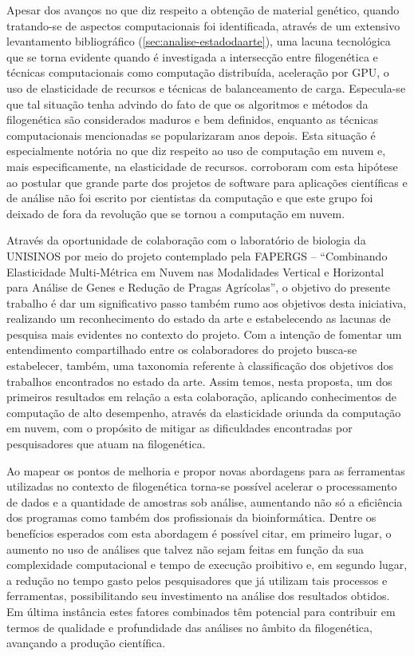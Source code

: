 \documentclass[english,brazilian]{UNISINOSmonografia} %
\begin{document}
Apesar dos avanços no que diz respeito a obtenção de material genético, quando tratando-se de aspectos computacionais foi identificada, através de um extensivo levantamento bibliográfico (\autoref{sec:analise-estadodaarte}), uma lacuna tecnológica que se torna evidente quando é investigada a intersecção entre filogenética e técnicas computacionais como computação distribuída, aceleração por GPU, o uso de elasticidade de recursos e técnicas de balanceamento de carga.
Especula-se que tal situação tenha advindo do fato de que os algoritmos e métodos da filogenética são considerados maduros e bem definidos, enquanto as técnicas computacionais mencionadas se popularizaram anos depois.
Esta situação é especialmente notória no que diz respeito ao uso de computação em nuvem e, mais especificamente, na elasticidade de recursos.
 corroboram com esta hipótese ao postular que grande parte dos projetos de software para aplicações científicas e de análise não foi escrito por cientistas da computação e que este grupo foi deixado de fora da revolução que se tornou a computação em nuvem.



Através da oportunidade de colaboração com o laboratório de biologia da UNISINOS por meio do projeto contemplado pela FAPERGS -- ``Combinando Elasticidade Multi-Métrica em Nuvem nas Modalidades Vertical e Horizontal para Análise de Genes e Redução de Pragas Agrícolas'', o objetivo do presente trabalho é dar um significativo passo também rumo aos objetivos desta iniciativa, realizando um reconhecimento do estado da arte e estabelecendo as lacunas de pesquisa mais evidentes no contexto do projeto.
Com a intenção de fomentar um entendimento compartilhado entre os colaboradores do projeto busca-se estabelecer, também, uma taxonomia referente à classificação dos objetivos dos trabalhos encontrados no estado da arte.
Assim temos, nesta proposta, um dos primeiros resultados em relação a esta colaboração, aplicando conhecimentos de computação de alto desempenho, através da elasticidade oriunda da computação em nuvem, com o propósito de mitigar as dificuldades encontradas por pesquisadores que atuam na filogenética.




Ao mapear os pontos de melhoria e propor novas abordagens para as ferramentas utilizadas no contexto de filogenética torna-se possível acelerar o processamento de dados e a quantidade de amostras sob análise, aumentando não só a eficiência dos programas como também dos profissionais da bioinformática.
Dentre os benefícios esperados com esta abordagem é possível citar, em primeiro lugar, o aumento no uso de análises que talvez não sejam feitas em função da sua complexidade computacional e tempo de execução proibitivo e, em segundo lugar, a redução no tempo gasto pelos pesquisadores que já utilizam tais processos e ferramentas, possibilitando seu investimento na análise dos resultados obtidos.
Em última instância estes fatores combinados têm potencial para contribuir em termos de qualidade e profundidade das análises no âmbito da filogenética, avançando a produção científica.
\end{document}
